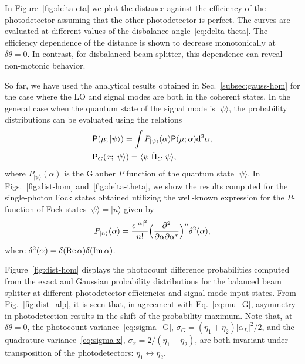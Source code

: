 \documentclass[%
reprint,
superscriptaddress,
 amsmath,amssymb,amsfonts,
 aps,
 pra,
 longbibliography
]{revtex4-2}
\newcommand{\ket}[1]{\ensuremath{|{#1}\rangle}}
\newcommand{\bra}[1]{\ensuremath{\langle{#1}|}}
\newcommand{\cnj}[1]{{#1}^{\ast}}
\renewcommand{\Re}{\mathop{\rm Re}\nolimits}
\renewcommand{\Im}{\mathop{\rm Im}\nolimits}
\newcommand{\prob}{\mathsf{P}}
\newcommand{\dd}{\mathrm{d}}
\begin{document}
      In Figure~\ref{fig:delta-eta}
      we plot the distance against
      the efficiency of the photodetector assuming that the
      other photodetector is perfect.
      The curves are evaluated at different values of the
      disbalance angle~\eqref{eq:delta-theta}.
The efficiency dependence of
the distance
is shown to decrease monotonically at $\delta\theta=0$.
In contrast, for disbalanced beam splitter, this dependence can
reveal non-motonic behavior.

So far, we have used the analytical results
obtained in Sec.~\ref{subsec:gauss-hom}
for the case where the LO and signal modes are both
in the coherent states.
In the general case when the quantum state of the signal mode
is $\ket{\psi}$,
the probability distributions can be evaluated
using the relations
\begin{align}
  &
\label{eq:average-P-func}
    \prob(\mu;\ket{\psi})=\int  P_{\ket{\psi}}(\alpha)\prob(\mu;\alpha)\dd^2\alpha,
    \notag
  \\
  &
    \prob_G(x;\ket{\psi})=\bra{\psi}\hat{\Pi}_G\ket{\psi},
\end{align}
where $P_{\ket{\psi}}(\alpha)$ is the Glauber $P$ function of the quantum state
$\ket{\psi}$.
In Figs.~\ref{fig:dist-hom}
and~\ref{fig:delta-theta},
we show the results computed for the single-photon Fock states
obtained utilizing
the well-known expression for
the $P$-function of Fock states $\ket{\psi}=\ket{n}$ given by
\begin{equation}
\label{eq:P-function_fock}
P_{\ket{n}}(\alpha)=
\frac{e^{|\alpha|^2}}{n!}
\Bigl(
\frac{\partial^2}{\partial\alpha\partial\cnj{\alpha}}
\Bigr)^n
\delta^{2}(\alpha),
\end{equation}
where $\delta^{2}(\alpha)=\delta(\Re\alpha)\delta(\Im\alpha)$.

Figure~\ref{fig:dist-hom} displays
the photocount difference probabilities
computed from
the exact and Gaussian probability distributions
for the balanced beam splitter at different photodetector efficiencies
and signal mode input states.
From Fig.~\ref{fig:dist_alp},
it is seen that,
in agreement with Eq.~\eqref{eq:mu_G},
asymmetry in photodetection
results in the shift of the probability maximum.
Note that, at $\delta\theta=0$,
the photocount variance~\eqref{eq:sigma_G},
$\sigma_G=(\eta_1+\eta_2)|\alpha_L|^2/2$, and
the quadrature variance~\eqref{eq:sigma-x},
$\sigma_x=2/(\eta_1+\eta_2)$,
are both invariant under transposition of the photodetectors:
$\eta_{1}\leftrightarrow \eta_{2}$.
\end{document}
